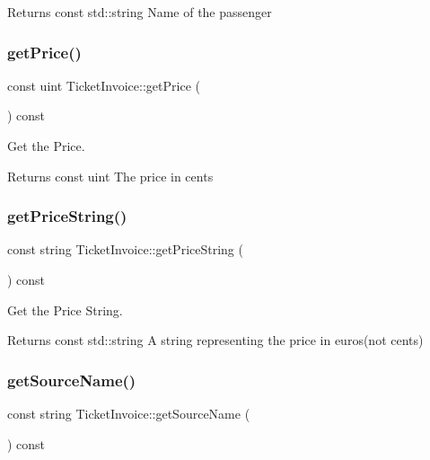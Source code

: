 \begin{DoxyReturn}{Returns}
const std\+::string Name of the passenger 
\end{DoxyReturn}
\mbox{\label{classTicketInvoice_a3758bface685702a6229d617691663e1}} 
\subsubsection{\texorpdfstring{get\+Price()}{getPrice()}}
{\footnotesize\ttfamily const uint Ticket\+Invoice\+::get\+Price (\begin{DoxyParamCaption}{ }\end{DoxyParamCaption}) const}



Get the Price. 

\begin{DoxyReturn}{Returns}
const uint The price in cents 
\end{DoxyReturn}
\mbox{\label{classTicketInvoice_a97998091765f01ff9f394210530a89ed}} 
\subsubsection{\texorpdfstring{get\+Price\+String()}{getPriceString()}}
{\footnotesize\ttfamily const string Ticket\+Invoice\+::get\+Price\+String (\begin{DoxyParamCaption}{ }\end{DoxyParamCaption}) const}



Get the Price String. 

\begin{DoxyReturn}{Returns}
const std\+::string A string representing the price in euros(not cents) 
\end{DoxyReturn}
\mbox{\label{classTicketInvoice_ad692197170d5cb11790dff71150ef891}} 
\subsubsection{\texorpdfstring{get\+Source\+Name()}{getSourceName()}}
{\footnotesize\ttfamily const string Ticket\+Invoice\+::get\+Source\+Name (\begin{DoxyParamCaption}{ }\end{DoxyParamCaption}) const}



